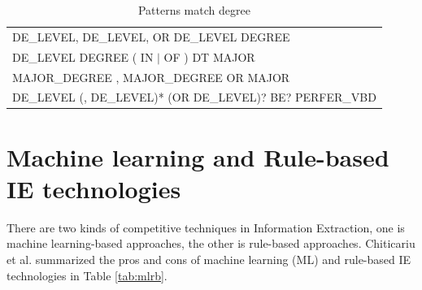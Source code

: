 \begin{table}[ht]
\small
\caption{Patterns match degree} %
\centering %
\begin{tabular}{  | l  |  }
 \hline
 DE\_LEVEL,  DE\_LEVEL, OR  DE\_LEVEL DEGREE   \\
 DE\_LEVEL DEGREE ( IN  $\vert$  OF ) DT MAJOR   \\
 MAJOR\_DEGREE  ,  MAJOR\_DEGREE OR MAJOR \\
 DE\_LEVEL (, DE\_LEVEL)* (OR DE\_LEVEL)? BE? PERFER\_VBD   \\
 \hline
\end{tabular}
\label{tab:patterns} %
\end{table}

\section{Machine learning and Rule-based IE technologies}

There are two kinds of competitive techniques in Information Extraction, one is machine learning-based approaches, the other is rule-based approaches. Chiticariu et al. \cite{chiticariu2013rule} summarized the pros and cons of machine learning (ML) and rule-based IE technologies in Table \ref{tab:mlrb}.

